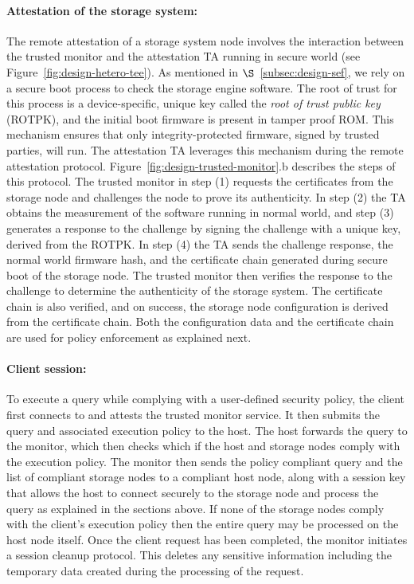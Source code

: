 \paragraph{Attestation of the storage system:} The remote attestation of a storage system node involves the interaction between the trusted monitor and the attestation TA running in secure world (see Figure~\ref{fig:design-hetero-tee}). As mentioned in $\S$~\ref{subsec:design-sef}, we rely on a secure boot process to check the storage engine software.
The root of trust for this process is a device-specific, unique key called the \textit{root of trust public key} (ROTPK), and the initial boot firmware is present in tamper proof ROM. This mechanism ensures that only integrity-protected firmware, signed by trusted parties, will run. The attestation TA leverages this mechanism during the remote attestation protocol. Figure~\ref{fig:design-trusted-monitor}.b describes the steps of this protocol.
The trusted monitor in step (1) requests the certificates from the storage node and challenges the node to prove its authenticity. In step (2) the TA obtains the measurement of the software running in normal world, and step (3) generates a response to the challenge by signing the challenge with a unique key, derived from the ROTPK. %
In step (4) the TA sends the challenge response, the normal world firmware hash, and the certificate chain generated during secure boot of the storage node. The trusted monitor then verifies the response to the challenge to determine the authenticity of the storage system. The certificate chain is also verified, and on success, the storage node configuration is derived from the certificate chain. Both the configuration data and the certificate chain are used for policy enforcement as explained next. 

\paragraph{Client session:} To execute a query while complying with a user-defined security policy, the client first connects to and attests the trusted monitor service. It then submits the query and associated execution policy to the host. The host forwards the query to the monitor, which then checks which if the host and storage nodes comply with the execution policy. The monitor then sends the policy compliant query and the list of compliant storage nodes to a compliant host node, along with a session key that allows the host to connect securely to the storage node and process the query as explained in the sections above. If none of the storage nodes comply with the client's execution policy then the entire query may be processed on the host node itself. Once the client request has been completed, the monitor initiates a session cleanup protocol. This deletes any sensitive information including the temporary data created during the processing of the request.

